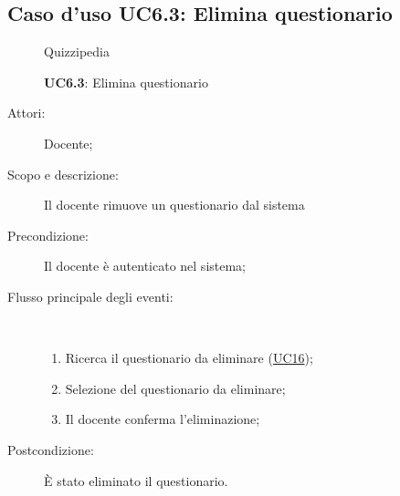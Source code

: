 \subsection{Caso d'uso UC6.3: Elimina questionario}
	\begin{figure}[H]
		\centering
		\begin{resizedtikzpicture}{\textwidth}
		\begin{umlsystem}[x=0, fill=lightgray!20]{Quizzipedia}
		\end{umlsystem}
		\end{resizedtikzpicture}
		\caption{\textbf{UC6.3}: Elimina questionario}
		\label{UC6.3}
	\end{figure}
\begin{description}
\item[Attori:] Docente;
\item[Scopo e descrizione:] Il docente rimuove un questionario dal sistema
      \item[Precondizione:] Il docente è autenticato nel sistema;

        \item[Flusso principale degli eventi:] \ 
 \begin{enumerate}
          \item Ricerca il questionario da eliminare (\hyperlink{UC16}{UC16});
          \item Selezione del questionario da eliminare;
          \item Il docente conferma l'eliminazione;

      \end{enumerate}
    \item[Postcondizione:] È stato eliminato il questionario.
  \end{description}
\hypertarget{UC6.4}{}
